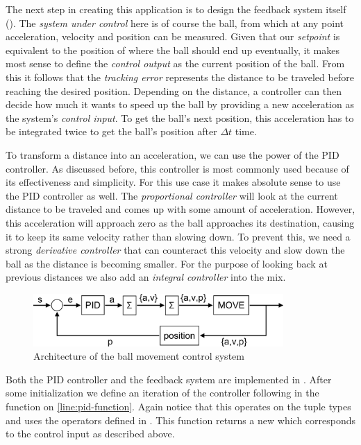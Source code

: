 The next step in creating this application is to design the feedback system itself (). The \textit{system under control} here is of course the ball, from which at any point acceleration, velocity and position can be measured. Given that our \textit{setpoint} is equivalent to the position of where the ball should end up eventually, it makes most sense to define the \textit{control output} as the current position of the ball. From this it follows that the \textit{tracking error} represents the distance to be traveled before reaching the desired position. Depending on the distance, a controller can then decide how much it wants to speed up the ball by providing a new acceleration as the system's \textit{control input}. To get the ball's next position, this acceleration has to be integrated twice to get the ball's position after $\Delta t$ time.

To transform a distance into an acceleration, we can use the power of the PID controller. As discussed before, this controller is most commonly used because of its effectiveness and simplicity. For this use case it makes absolute sense to use the PID controller as well. The \textit{proportional controller} will look at the current distance to be traveled and comes up with some amount of acceleration. However, this acceleration will approach zero as the ball approaches its destination, causing it to keep its same velocity rather than slowing down. To prevent this, we need a strong \textit{derivative controller} that can counteract this velocity and slow down the ball as the distance is becoming smaller. For the purpose of looking back at previous distances we also add an \textit{integral controller} into the mix.

\begin{figure}[H]
	\begin{center}
		\includegraphics[width=0.85\textwidth]{figures/BallTracker-diagram.png}
	\end{center}
	\caption{Architecture of the ball movement control system}
	\label{fig:balltracker-diagram}
\end{figure}

Both the PID controller and the feedback system are implemented in . After some initialization we define an iteration of the controller following  in the  function on \cref{line:pid-function}. Again notice that this operates on the tuple types and uses the operators defined in . This function returns a new  which corresponds to the control input as described above.

